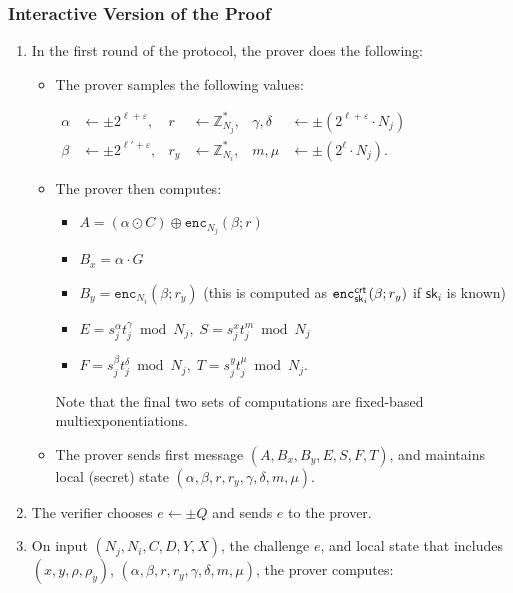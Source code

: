 \documentclass[11pt]{article}
\def\crt{{\sf crt}}
\newcommand{\enc}{\ensuremath{\mathtt{enc}}}
\newcommand{\commit}[1]{\ensuremath{\mathtt{Commit}_{\mathtt{#1}}}}
\newcommand{\sk}{\textsf{sk}}
\newcommand{\Z}{\mathbb{Z}}
\newcommand{\?}[1]{\stackrel{?}{#1}}
\begin{document}
\subsubsection{Interactive Version of the Proof}
\begin{enumerate}
    \item In the first round of the protocol, the prover does the following:
    \begin{itemize}
        \item The prover samples the following values: 

        $\begin{aligned}
            \alpha &\gets \pm 2^{\ell+\varepsilon},   & r   &\gets \Z^*_{N_j}, & \gamma, \delta &\gets \pm (2^{\ell + \varepsilon} \cdot N_j)\\
            \beta &\gets \pm 2^{\ell' + \varepsilon}, & r_y &\gets \Z^*_{N_i}, & m, \mu         &\gets \pm (2^\ell \cdot N_j).
        \end{aligned}$

        \item The prover then computes:
\begin{itemize}
        \item $A = (\alpha \odot C) \oplus \enc_{N_j}(\beta; r)$
          \item  $B_x = \alpha \cdot G $
          \item  $B_y = \enc_{N_i}(\beta; r_y)$ (this is computed as $\enc^\crt_{\sk_i}(\beta; r_y)$ if $\sk_i$ is known)
            \item $E = s_j^\alpha t_j^\gamma \bmod N_j, \; S = s_j^x t_j^m \bmod N_j$ 
            \item $F = s_j^\beta t_j^\delta \bmod N_j, \; T = s_j^y t_j^\mu \bmod N_j$.
        \end{itemize}
        Note that the final two sets of computations are fixed-based multiexponentiations.

        \item The prover sends first message $(A,B_x,B_y,E,S,F,T)$, and maintains local (secret) state $(\alpha, \beta, r, r_y, \gamma, \delta, m, \mu)$.
    \end{itemize}

    \item The verifier chooses $e \leftarrow \pm Q$ and sends $e$ to the prover.

    \item On input $(N_j, N_i, C, D, Y, X)$, the challenge $e$, and local state that includes $(x, y, \rho, \rho_y)$, $(\alpha,\beta,r,r_y,\gamma,\delta,m,\mu)$, the prover computes:


\end{enumerate}
\end{document}
